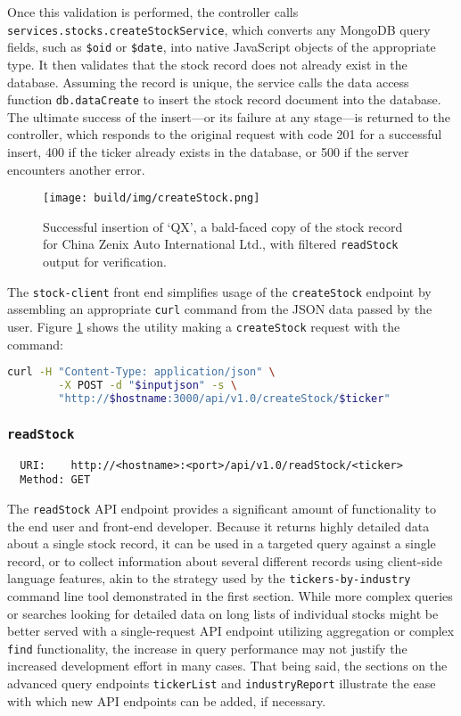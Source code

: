 \documentclass[
11pt,
titlepage,
]{article}
\begin{document}
Once this validation is performed, the controller calls
\texttt{services.stocks.createStockService}, which converts any MongoDB query
fields, such as \texttt{\$oid} or \texttt{\$date}, into native JavaScript
objects of the appropriate type. It then validates that the stock record does
not already exist in the database. Assuming the record is unique, the service
calls the data access function \texttt{db.dataCreate} to insert the stock record
document into the database. The ultimate success of the insert---or its failure
at any stage---is returned to the controller, which responds to the original
request with code 201 for a successful insert, 400 if the ticker already exists
in the database, or 500 if the server encounters another error.

\begin{figure}[tp]
  \texttt{[image: build/img/createStock.png]}
  \caption{Successful insertion of `QX', a bald-faced copy of the stock record
    for China Zenix Auto International Ltd., with filtered \texttt{readStock}
    output for verification.}
  \label{fig:createStock}
\end{figure}

The \texttt{stock-client} front end simplifies usage of the
\texttt{createStock} endpoint by assembling an appropriate \texttt{curl} command
from the JSON data passed by the user. Figure
\ref{fig:createStock} shows the utility making a \texttt{createStock} request
with the command:

\begin{lstlisting}[language=bash]
  curl -H "Content-Type: application/json" \
        -X POST -d "$inputjson" -s \
        "http://$hostname:3000/api/v1.0/createStock/$ticker"
\end{lstlisting}

\subsubsection{\texttt{readStock}}

\begin{lstlisting}
  URI:    http://<hostname>:<port>/api/v1.0/readStock/<ticker>
  Method: GET
\end{lstlisting}

The \texttt{readStock} API endpoint provides a significant amount of
functionality to the end user and front-end developer. Because it returns highly
detailed data about a single stock record, it can be used in a targeted query
against a single record, or to collect information about several different
records using client-side language features, akin to the strategy used by the
\texttt{tickers-by-industry} command line tool demonstrated in the first
section. While more complex queries or searches looking for detailed data on
long lists of individual stocks might be better served with a single-request API
endpoint utilizing aggregation or complex \texttt{find} functionality, the
increase in query performance may not justify the increased development effort
in many cases. That being said, the sections on the advanced query endpoints
\texttt{tickerList} and \texttt{industryReport} illustrate the ease with which
new API endpoints can be added, if necessary.
\end{document}
